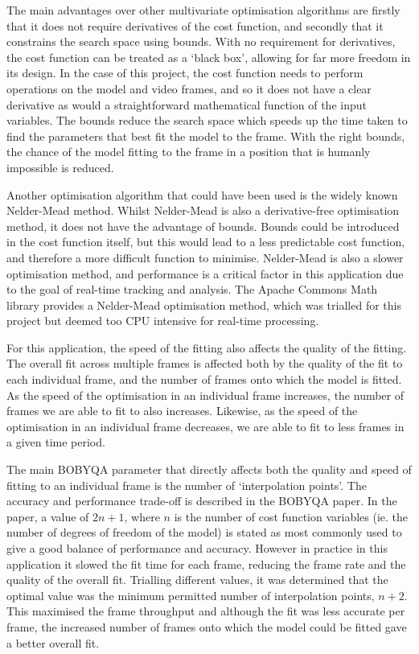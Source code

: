 The main advantages over other multivariate optimisation algorithms are firstly that it does not require derivatives of the cost function, and secondly that it constrains the search space using bounds. With no requirement for derivatives, the cost function can be treated as a `black box', allowing for far more freedom in its design. In the case of this project, the cost function needs to perform operations on the model and video frames, and so it does not have a clear derivative as would a straightforward mathematical function of the input variables. The bounds reduce the search space which speeds up the time taken to find the parameters that best fit the model to the frame. With the right bounds, the chance of the model fitting to the frame in a position that is humanly impossible is reduced.

Another optimisation algorithm that could have been used is the widely known Nelder-Mead method\cite{neldermead}. Whilst Nelder-Mead is also a derivative-free optimisation method, it does not have the advantage of bounds. Bounds could be introduced in the cost function itself, but this would lead to a less predictable cost function, and therefore a more difficult function to minimise. Nelder-Mead is also a slower optimisation method, and performance is a critical factor in this application due to the goal of real-time tracking and analysis. The Apache Commons Math library\cite{apachemath} provides a Nelder-Mead optimisation method, which was trialled for this project but deemed too CPU intensive for real-time processing.

For this application, the speed of the fitting also affects the quality of the fitting. The overall fit across multiple frames is affected both by the quality of the fit to each individual frame, and the number of frames onto which the model is fitted. As the speed of the optimisation in an individual frame increases, the number of frames we are able to fit to also increases. Likewise, as the speed of the optimisation in an individual frame decreases, we are able to fit to less frames in a given time period.

The main BOBYQA parameter that directly affects both the quality and speed of fitting to an individual frame is the number of `interpolation points'. The accuracy and performance trade-off is described in the BOBYQA paper\cite{bobyqa}. In the paper, a value of $2n + 1$, where $n$ is the number of cost function variables (ie. the number of degrees of freedom of the model) is stated as most commonly used to give a good balance of performance and accuracy. However in practice in this application it slowed the fit time for each frame, reducing the frame rate and the quality of the overall fit. Trialling different values, it was determined that the optimal value was the minimum permitted number of interpolation points, $n + 2$. This maximised the frame throughput and although the fit was less accurate per frame, the increased number of frames onto which the model could be fitted gave a better overall fit.

